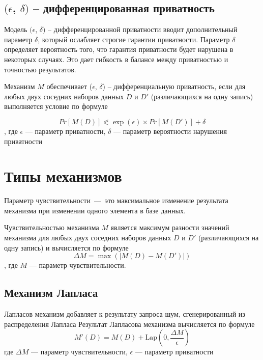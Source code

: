 \subsection{$(\epsilon$, $\delta)$ -- дифференцированная приватность}
Модель $(\epsilon$, $\delta)$ -- дифференцированной приватности вводит дополнительный параметр $\delta$, который ослабляет строгие гарантии приватности.
Параметр $\delta$ определяет вероятность того, что гарантия приватности будет нарушена в некоторых случаях.
Это дает гибкость в балансе между приватностью и точностью результатов.%

Механизм $M$ обеспечивает ($\epsilon$, $\delta$) -- дифференциальную приватность, если для любых двух соседних наборов данных $D$ и $D'$ (различающихся на одну запись) выполняется условие по формуле%

\begin{equation}\label{equ:eps-delta-diff}
	Pr[M(D)] \eqslantless \exp(\epsilon) \times Pr[M(D')] + \delta
\end{equation}
, где $\epsilon$ --- параметр приватности, $\delta$ --- параметр вероятности нарушения приватности



\section{Типы механизмов}

Параметр чувствительности~---~это максимальное изменение результата механизма при изменении одного элемента в базе данных.~\cite{db}

Чувствительностью механизма $M$ является максимум разности значений механизма для любых двух соседних наборов данных $D$ и $D'$ (различающихся на одну запись) и вычисляется по формуле%
\begin{equation}\label{eq:sens}
	\Delta M  = \max(|M(D) - M(D')|)
\end{equation}
, где $M$ --- параметр чувствительности.

\subsection{Механизм Лапласа}
Лапласов механизм добавляет к результату запроса шум, сгенерированный из распределения Лапласа%
Результат Лапласова механизма вычисляется по формуле%
\begin{equation}\label{eq:laplas}
	M'(D) = M(D) + \text{Lap}(0, \frac{\Delta M}{\epsilon})
\end{equation}
где $\Delta M$ --- параметр чувствительности, $\epsilon$ --- параметр приватности

